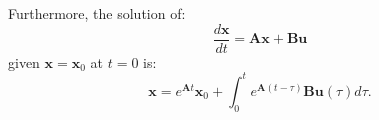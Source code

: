 Furthermore, the solution of:
\[
\frac{d\mathbf{x}}{dt}=\mathbf{Ax} + \mathbf{Bu}
\]
given $\mathbf{x}=\mathbf{x}_0$ at $t=0$ is:
\[
\mathbf{x}=e^{\mathbf{A}t}\mathbf{x}_0 + \int_0^t e^{\mathbf{A}(t-\tau)}\mathbf{Bu}(\tau)d\tau.
\]

\endinput

